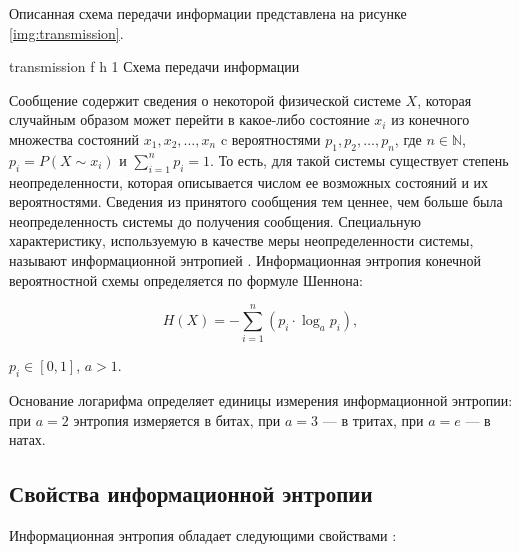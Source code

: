 Описанная схема передачи информации представлена на рисунке \ref{img:transmission}.

    {transmission}
    {f}
    {h}
    {1\textwidth}
    {Схема передачи информации}
    
Сообщение содержит сведения о некоторой физической системе $X$, которая случайным образом может перейти в какое-либо состояние $x_{i}$ из конечного множества состояний $x_{1}, x_{2}, \dots, x_{n}$ c вероятностями $p_{1}, p_{2}, \dots, p_{n}$, где $n \in \mathbb{N}$, $p_{i} = P(X \sim x_{i})$ и $\sum_{i = 1}^n p_{i} = 1$. То есть, для такой системы существует степень неопределенности, которая описывается числом ее возможных состояний и их вероятностями. Сведения из принятого сообщения тем ценнее, чем больше была неопределенность системы до получения сообщения. Специальную характеристику, используемую в качестве меры неопределенности системы, называют информационной энтропией \cite{definition}. Информационная энтропия конечной вероятностной схемы определяется по формуле Шеннона:

\begin{equation}\label{entropy}
	H(X) = -\sum_{i = 1}^n (p_{i} \cdot \log_{a}p_{i}),
\end{equation}

 $p_{i} \in [0, 1]$, $a > 1$.

Основание логарифма определяет единицы измерения информационной энтропии: при $a = 2$ энтропия измеряется в битах, при $a = 3$ --- в тритах, при $a = e$ --- в натах.

\subsection{Свойства информационной энтропии}\label{properties}

Информационная энтропия обладает следующими свойствами \cite{properties}:

